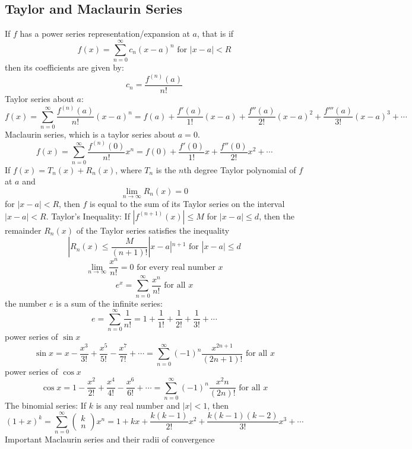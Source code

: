 \documentclass{article}
\begin{document}
    \subsection{Taylor and Maclaurin Series}
    \begin{outline}
        \1 If $f$ has a power series representation/expansion at $a$, that is if \[f(x)=\sum^\infty_{n=0}c_n(x-a)^n \text{ for } |x-a|<R\] then its coefficients are given by: \[c_n=\dfrac{f^{(n)}(a)}{n!}\]
        \1 Taylor series about $a$: \[f(x)=\sum^\infty_{n=0}\dfrac{f^{(n)}(a)}{n!}(x-a)^n=f(a)+\dfrac{f'(a)}{1!}(x-a)+\dfrac{f''(a)}{2!}(x-a)^2+\dfrac{f'''(a)}{3!}(x-a)^3+\cdots\]
        \1 Maclaurin series, which is a taylor series about $a=0$. \[f(x)=\sum^\infty_{n=0}\dfrac{f^{(n)}(0)}{n!}x^n=f(0)+\dfrac{f'(0)}{1!}x+\dfrac{f''(0)}{2!}x^2+\cdots\]
        \1 If \(f(x)=T_n(x)+R_n(x)\), where $T_n$ is the $n$th degree Taylor polynomial of $f$ at $a$ and \[\lim_{n\to\infty}R_n(x)=0\] for \(|x-a|<R\), then $f$ is equal to the sum of its Taylor series on the interval \(|x-a|<R\). 
        \1 Taylor's Inequality: If \(|f^{(n+1)}(x)|\leq M\) for \(|x-a|\leq d\), then the remainder \(R_n(x)\) of the Taylor series satisfies the inequality \[|R_n(x)\leq\dfrac{M}{(n+1)!}|x-a|^{n+1}\mbox{ for }|x-a|\leq d\]
        \1 \[\lim_{n\to\infty}\dfrac{x^n}{n!}=0\mbox{ for every real number }x\]
        \1 \[e^x=\sum^\infty_{n=0}\dfrac{x^n}{n!}\mbox{ for all }x\]
        \1 the number $e$ is a sum of the infinite series: \[e=\sum^\infty_{n=0}\dfrac{1}{n!}=1+\dfrac{1}{1!}+\dfrac{1}{2!}+\dfrac{1}{3!}+\cdots\]
        \1 power series of \(\sin x\)\[\sin x=x-\dfrac{x^3}{3!}+\dfrac{x^5}{5!}-\dfrac{x^7}{7!}+\cdots=\sum^\infty_{n=0}(-1)^n\dfrac{x^{2n+1}}{(2n+1)!}\mbox{ for all }x\]
        \1 power series of \(\cos x\)\[\cos x=1-\dfrac{x^2}{2!}+\dfrac{x^4}{4!}-\dfrac{x^6}{6!}+\cdots=\sum^\infty_{n=0}(-1)^n\dfrac{x^2n}{(2n)!}\text{ for all }x\]
        \1 The binomial series: If $k$ is any real number and \(|x|<1\), then \[(1+x)^k=\sum^\infty_{n=0}\begin{pmatrix}k\\n\end{pmatrix}x^n=1+kx+\dfrac{k(k-1)}{2!}x^2+\dfrac{k(k-1)(k-2)}{3!}x^3+\cdots\]
        \1 Important Maclaurin series and their radii of convergence
    \end{outline}
\end{document}
